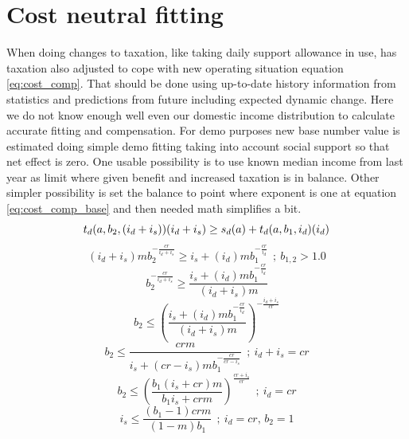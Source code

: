 \section{Cost neutral fitting}
\label{cost_neutral_fitting}
When doing changes to taxation, like taking daily support allowance in use,
has taxation also adjusted to cope with new operating situation equation
\ref{eq:cost_comp}. That should be done using up-to-date history information
from statistics and predictions from future including expected dynamic change.
Here we do not know enough well even our domestic income distribution to
calculate accurate fitting and compensation. For demo purposes new base number
value is estimated doing simple demo fitting taking into account social
support so that net effect is zero. One usable possibility is to use known
median income from last year as limit where given benefit and increased
taxation is in balance. Other simpler possibility is set the balance to point
where exponent is one at equation \ref{eq:cost_comp_base} and then needed math
simplifies a bit.
\begin{equation} \label{eq:cost_comp} \index{compensation}
t_d(a,b_2,(i_d+i_s))(i_d+i_s) \geq s_d(a)+t_d(a,b_1,i_d)(i_d)
\end{equation}
\begin{equation} \label{eq:cost_comp_1}
(i_d+i_s)m b_2^{-\frac{cr}{i_d+i_s}}\geq i_s+(i_d) m b_1^{-\frac{cr}{i_d}}
~~;~ b_{1,2} > 1.0
\end{equation}
\begin{equation} \label{eq:cost_comp_2}
b_2^{-\frac{cr}{i_d+i_s}}\geq
\frac{i_s+(i_d)m b_1^{-\frac{cr}{i_d}}}{(i_d+i_s)m}
\end{equation}
\begin{equation} \label{eq:cost_comp_base}
b_2\leq\left(\frac{i_s+(i_d)m b_1^{-\frac{cr}{i_d}}}
{(i_d+i_s)m}\right)^{-\frac{i_d+i_s}{cr}}
\end{equation}
\begin{equation} \label{eq:cost_comp_base_cridis}
b_2\leq\frac{crm}{i_s+(cr-i_s)m b_1^{-\frac{cr}{cr-i_s}}}~~;~i_d+i_s=cr
\end{equation}
\begin{equation} \label{eq:cost_comp_base_crid}
b_2\leq\left(\frac{b_1(i_s+cr)m}
{b_1i_s+crm}\right)^\frac{cr+i_s}{cr}~~;~i_d=cr
\end{equation}
\begin{equation} \label{eq:cost_comp_is_b2_1}
i_s\leq\frac{(b_1-1)crm}{(1-m)b_1}~~;~i_d=cr,\,b_2=1
\end{equation}


